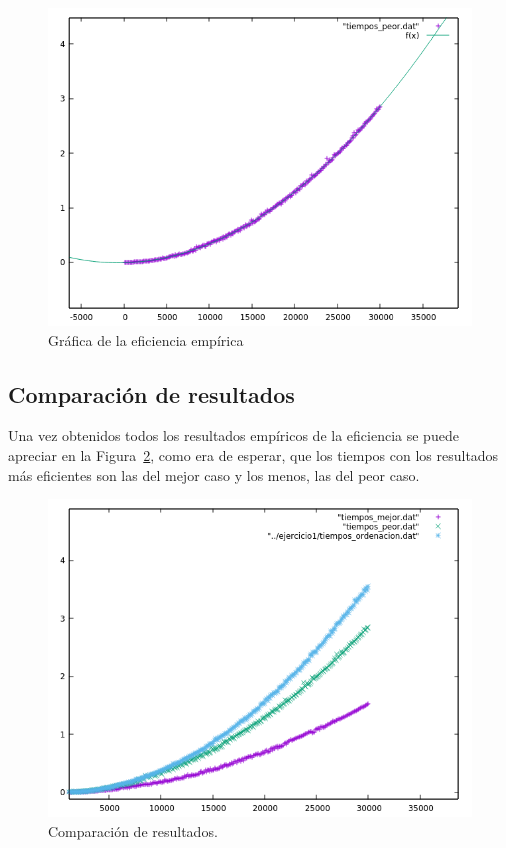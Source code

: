 \begin{figure}[H] %
\centering
\includegraphics[scale=0.6]{ejercicio4/regresionPeor.png}  
\caption{Gráfica de la eficiencia empírica} 
\label{fig:figura4-4}
\end{figure}

\newpage
\subsection{Comparación de resultados}
Una vez obtenidos todos los resultados empíricos de la eficiencia se puede apreciar en la Figura~\ref{fig:figura4-5}, como era de esperar, que los tiempos con los resultados más eficientes son las del mejor caso y los menos, las del peor caso.
\begin{figure}[H] %
\centering
\includegraphics[scale=0.8]{ejercicio4/comparacionTodas.png}  
\caption{Comparación de resultados.} 
\label{fig:figura4-5}
\end{figure}


